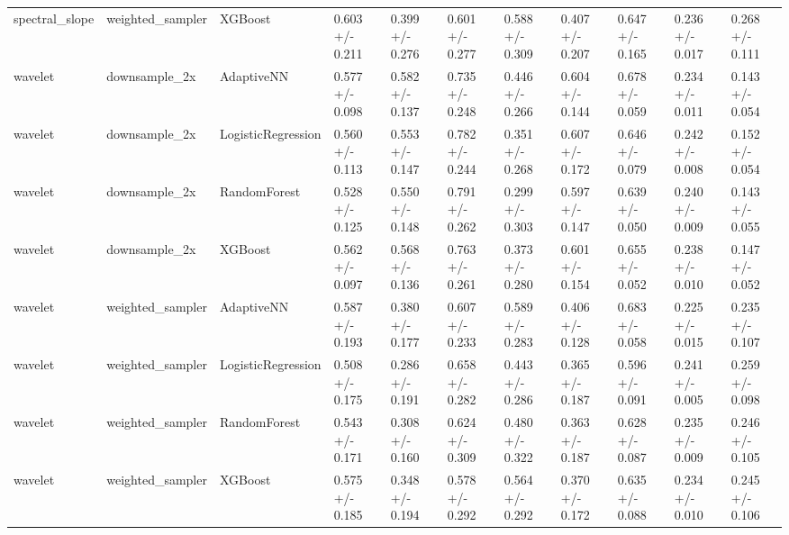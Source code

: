 \begin{tabular}{lllllllllll}
spectral_slope & weighted_sampler & XGBoost & 0.603 +/- 0.211 & 0.399 +/- 0.276 & 0.601 +/- 0.277 & 0.588 +/- 0.309 & 0.407 +/- 0.207 & 0.647 +/- 0.165 & 0.236 +/- 0.017 & 0.268 +/- 0.111 \\
wavelet & downsample_2x & AdaptiveNN & 0.577 +/- 0.098 & 0.582 +/- 0.137 & 0.735 +/- 0.248 & 0.446 +/- 0.266 & 0.604 +/- 0.144 & 0.678 +/- 0.059 & 0.234 +/- 0.011 & 0.143 +/- 0.054 \\
wavelet & downsample_2x & LogisticRegression & 0.560 +/- 0.113 & 0.553 +/- 0.147 & 0.782 +/- 0.244 & 0.351 +/- 0.268 & 0.607 +/- 0.172 & 0.646 +/- 0.079 & 0.242 +/- 0.008 & 0.152 +/- 0.054 \\
wavelet & downsample_2x & RandomForest & 0.528 +/- 0.125 & 0.550 +/- 0.148 & 0.791 +/- 0.262 & 0.299 +/- 0.303 & 0.597 +/- 0.147 & 0.639 +/- 0.050 & 0.240 +/- 0.009 & 0.143 +/- 0.055 \\
wavelet & downsample_2x & XGBoost & 0.562 +/- 0.097 & 0.568 +/- 0.136 & 0.763 +/- 0.261 & 0.373 +/- 0.280 & 0.601 +/- 0.154 & 0.655 +/- 0.052 & 0.238 +/- 0.010 & 0.147 +/- 0.052 \\
wavelet & weighted_sampler & AdaptiveNN & 0.587 +/- 0.193 & 0.380 +/- 0.177 & 0.607 +/- 0.233 & 0.589 +/- 0.283 & 0.406 +/- 0.128 & 0.683 +/- 0.058 & 0.225 +/- 0.015 & 0.235 +/- 0.107 \\
wavelet & weighted_sampler & LogisticRegression & 0.508 +/- 0.175 & 0.286 +/- 0.191 & 0.658 +/- 0.282 & 0.443 +/- 0.286 & 0.365 +/- 0.187 & 0.596 +/- 0.091 & 0.241 +/- 0.005 & 0.259 +/- 0.098 \\
wavelet & weighted_sampler & RandomForest & 0.543 +/- 0.171 & 0.308 +/- 0.160 & 0.624 +/- 0.309 & 0.480 +/- 0.322 & 0.363 +/- 0.187 & 0.628 +/- 0.087 & 0.235 +/- 0.009 & 0.246 +/- 0.105 \\
wavelet & weighted_sampler & XGBoost & 0.575 +/- 0.185 & 0.348 +/- 0.194 & 0.578 +/- 0.292 & 0.564 +/- 0.292 & 0.370 +/- 0.172 & 0.635 +/- 0.088 & 0.234 +/- 0.010 & 0.245 +/- 0.106 \\
\bottomrule
\end{tabular}
